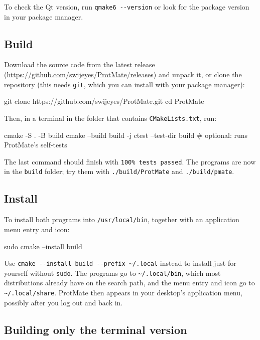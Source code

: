 \documentclass[11pt,a4paper,oneside]{report}
\newcommand{\repourl}{https://github.com/swijeyes/ProtMate}
\newcommand{\releases}{\url{\repourl/releases}}
\newcommand{\cmd}[1]{\texttt{#1}}            %
\begin{document}
To check the Qt version, run \cmd{qmake6 -{}-version} or look for the package version in your
package manager.

\subsection{Build}

Download the source code from the latest release (\releases) and unpack it, or clone the
repository (this needs \cmd{git}, which you can install with your package manager):

\begin{terminal}
git clone https://github.com/swijeyes/ProtMate.git
cd ProtMate
\end{terminal}

Then, in a terminal in the folder that contains \cmd{CMakeLists.txt}, run:

\begin{terminal}
cmake -S . -B build
cmake --build build -j
ctest --test-dir build        # optional: runs ProtMate's self-tests
\end{terminal}

The last command should finish with \cmd{100\% tests passed}. The programs are now in the
\cmd{build} folder; try them with \cmd{./build/ProtMate} and \cmd{./build/pmate}.

\subsection{Install}

To install both programs into \cmd{/usr/local/bin}, together with an application menu entry and
icon:

\begin{terminal}
sudo cmake --install build
\end{terminal}

Use \cmd{cmake -{}-install build -{}-prefix \textasciitilde/.local} instead to install just for
yourself without \cmd{sudo}. The programs go to \cmd{\textasciitilde/.local/bin}, which most
distributions already have on the search path, and the menu entry and icon go to
\cmd{\textasciitilde/.local/share}. ProtMate then appears in your desktop's application menu,
possibly after you log out and back in.

\subsection{Building only the terminal version}\label{sec:cli-only}
\end{document}

